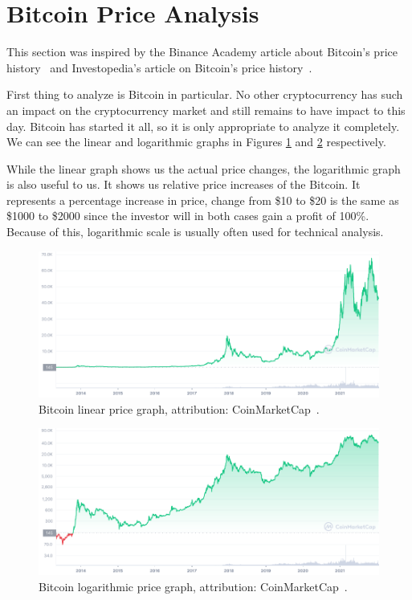 \section{Bitcoin Price Analysis}
This section was inspired by the Binance Academy article about Bitcoin's price history~\cite{binance:bitcoin-price-history} and Investopedia's article on Bitcoin's price history~\cite{investopedia:bitcoin-price-history}.

First thing to analyze is Bitcoin in particular. No other cryptocurrency has such an impact on the cryptocurrency market and still remains to have impact to this day. Bitcoin has started it all, so it is only appropriate to analyze it completely. We can see the linear and logarithmic graphs in Figures \ref{btc-linear-figure} and \ref{btc-log-figure} respectively.

While the linear graph shows us the actual price changes, the logarithmic graph is also useful to us. It shows us relative price increases of the Bitcoin. It represents a percentage increase in price, change from \$10 to \$20 is the same as \$1000 to \$2000 since the investor will in both cases gain a profit of 100\%. Because of this, logarithmic scale is usually often used for technical analysis.

\begin{figure}[!hbt]
    \centering
    \includegraphics[width=\columnwidth]{figures/BTC_ALL_linear.png}
    \caption{Bitcoin linear price graph, attribution: CoinMarketCap~\cite{coinmarketcap}.}
    \label{btc-linear-figure}
\end{figure}

\begin{figure}[!hbt]
    \centering
    \includegraphics[width=\columnwidth]{figures/BTC_ALL_log.png}
    \caption{Bitcoin logarithmic price graph, attribution: CoinMarketCap~\cite{coinmarketcap}.}
    \label{btc-log-figure}
\end{figure}

